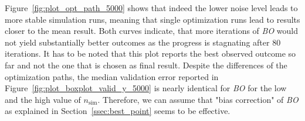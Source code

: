 \documentclass[bimj,fleqn]{w-art}
\theoremstyle{plain}
\theoremstyle{definition}
\begin{document}
Figure~\ref{fig:plot_opt_path_5000} shows that indeed the lower noise level leads to more stable simulation runs, meaning that single optimization runs lead to results closer to the mean result.
Both curves indicate, that more iterations of \emph{BO} would not yield substantially better outcomes as the progress is stagnating after 80 iterations.
It has to be noted that this plot reports the best observed outcome so far and not the one that is chosen as final result.
Despite the differences of the optimization paths, the median validation error reported in Figure~\ref{fig:plot_boxplot_valid_y_5000} is nearly identical for \emph{BO} for the low and the high value of $n_\text{sim}$.
Therefore, we can assume that "bias correction" of \emph{BO} as explained in Section~\ref{ssec:best_point} seems to be effective.
\end{document}
